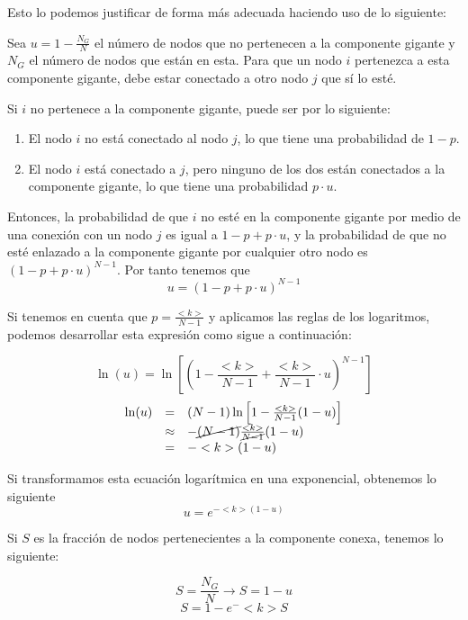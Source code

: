 \documentclass[paper=a4, fontsize=11pt]{article} %
\numberwithin{equation}{section} %
\numberwithin{figure}{section} %
\numberwithin{table}{section} %
\begin{document}
Esto lo podemos justificar de forma más adecuada haciendo uso de lo siguiente:

Sea $u = 1 - \frac{N_G}{N}$ el número de nodos que no pertenecen a la componente gigante y $N_G$ el número de nodos que están en esta. Para que un nodo $i$ pertenezca a esta componente gigante, debe estar conectado a otro nodo $j$ que sí lo esté. 

Si $i$ no pertenece a la componente gigante, puede ser por lo siguiente:
\begin{enumerate}
  \item El nodo $i$ no está conectado al nodo $j$, lo que tiene una probabilidad de $1-p$.
  \item El nodo $i$ está conectado a $j$, pero ninguno de los dos están conectados a la componente gigante, lo que tiene una probabilidad $p\cdot u$.
\end{enumerate}

Entonces, la probabilidad de que $i$ no esté en la componente gigante por medio de una conexión con un nodo $j$ es igual a $1-p + p \cdot u$, y la probabilidad de que no esté enlazado a la componente gigante por cualquier otro nodo es $(1-p+p\cdot u)^{N-1}$. Por tanto tenemos que $$u = (1-p+p\cdot u)^{N-1}$$

Si tenemos en cuenta que $p=\frac{<k>}{N-1}$ y aplicamos las reglas de los logaritmos, podemos desarrollar esta expresión como sigue a continuación:

\begin{displaymath}
  \ln(u) = \ln\left[\left(1 - \frac{<k>}{N-1} + \frac{<k>}{N-1}\cdot u\right)^{N-1}\right]
\end{displaymath}
\begin{displaymath}
\begin{array}{lcl}
  \ln(u) &=& (N-1)\ln\left[1 - \frac{<k>}{N-1}(1-u)\right] \\
  &\approx &- \cancel{(N-1)} \frac{<k>}{\cancel{N-1}}(1-u) \\
  & = &- <k>(1-u)
\end{array}
\end{displaymath}

Si transformamos esta ecuación logarítmica en una exponencial, obtenemos lo siguiente $$u=e^{- <k>(1-u)}$$

Si $S$ es la fracción de nodos pertenecientes a la componente conexa, tenemos lo siguiente:

\begin{displaymath}
  S = \frac{N_G}{N} \rightarrow S = 1 - u
\end{displaymath}
\begin{displaymath}
  S = 1 - e^-<k>S
\end{displaymath}
\end{document}
